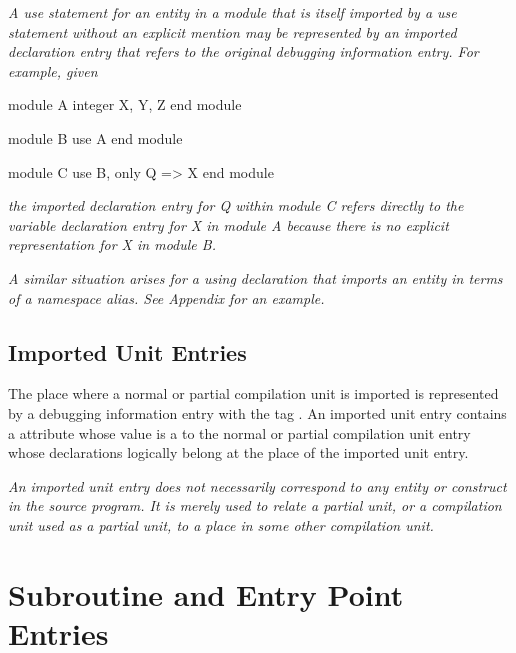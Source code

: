 \textit{A  use statement for an entity in a module that is
itself imported by a use statement without an explicit mention
may be represented by an imported declaration entry that refers
to the original debugging information entry. For example, given}
\par %
\vspace{2mm}
\begin{nlnlisting}
module A
integer X, Y, Z
end module

module B
use A
end module

module C
use B, only Q => X
end module

\end{nlnlisting}
\textit{the imported declaration entry for Q within module C refers
directly to the variable declaration entry for X in module A
because there is no explicit representation for X in module B.
}

\textit{A similar situation arises for a  using declaration
that imports an entity in terms of a namespace alias. See 
Appendix  
for an example.
}

\subsection{Imported Unit Entries}
\label{chap:importedunitentries}
\hypertarget{chap:DWATimportimportedunit}{}
The place where a normal or partial compilation unit is imported is
represented by a debugging information entry with the 
tag \DWTAGimportedunitTARG. 
An imported unit entry contains a
\DWATimportDEFN{} attribute 
whose value is a  to the
normal or partial compilation unit 
\bb
entry
\eb
whose declarations logically
belong at the place of the imported unit entry.

\textit{An imported unit entry does not necessarily correspond to
any entity or construct in the source program. It is merely
 used to relate a partial unit, or a compilation
unit used as a partial unit, to a place in some other
compilation unit.}

\section{Subroutine and Entry Point Entries}
\label{chap:subroutineandentrypointentries}

